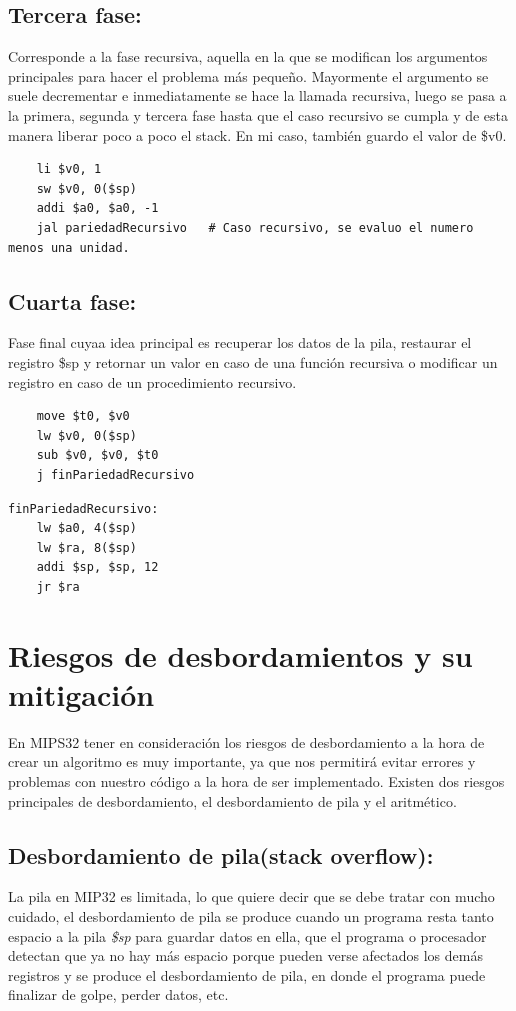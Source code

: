 \documentclass[12pt, a4paper]{article}
\begin{document}
\subsection{Tercera fase:} Corresponde a la fase recursiva, aquella en la que se modifican los argumentos principales para hacer el problema más pequeño. Mayormente el argumento se suele decrementar e inmediatamente se hace la llamada recursiva, luego se pasa a la primera, segunda y tercera fase hasta que el caso recursivo se cumpla y de esta manera liberar poco a poco el stack. En mi caso, también guardo el valor de \$v0.
\begin{lstlisting}
	li $v0, 1
	sw $v0, 0($sp)
	addi $a0, $a0, -1
	jal pariedadRecursivo	# Caso recursivo, se evaluo el numero menos una unidad.
\end{lstlisting}
\subsection{Cuarta fase:} Fase final cuyaa idea principal es recuperar los datos de la pila, restaurar el registro \$sp y retornar un valor en caso de una función recursiva o modificar un registro en caso de un procedimiento recursivo.
\begin{lstlisting}
	move $t0, $v0
	lw $v0, 0($sp)
	sub $v0, $v0, $t0
	j finPariedadRecursivo
\end{lstlisting}
\begin{lstlisting}
finPariedadRecursivo:
	lw $a0, 4($sp)
	lw $ra, 8($sp)
	addi $sp, $sp, 12
	jr $ra
\end{lstlisting}

\section{Riesgos de desbordamientos y su mitigación}

En MIPS32 tener en consideración los riesgos de desbordamiento a la hora de crear un algoritmo es muy importante, ya que nos permitirá evitar errores y problemas con nuestro código a la hora de ser implementado. Existen dos riesgos principales de desbordamiento, el desbordamiento de pila y el aritmético.

\subsection{Desbordamiento de pila(stack overflow):} La pila en MIP32 es limitada, lo que quiere decir que se debe tratar con mucho cuidado, el desbordamiento de pila se produce cuando un programa resta tanto espacio a la pila {\large\textit{\$sp}} para guardar datos en ella, que el programa o procesador detectan que ya no hay más espacio porque pueden verse afectados los demás registros y se produce el desbordamiento de pila, en donde el programa puede finalizar de golpe, perder datos, etc.
\end{document}
